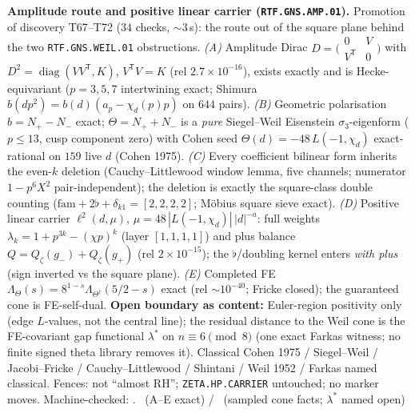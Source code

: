 \par\smallskip\noindent\textbf{Amplitude route and positive linear carrier
(\texttt{RTF.GNS.AMP.01}).}
Promotion of discovery T67--T72 ($34$ checks, $\sim3$\,s): the route out of the
square plane behind the two \texttt{RTF.GNS.WEIL.01} obstructions.
\emph{(A)} Amplitude Dirac
$D=\bigl(\begin{smallmatrix}0&V\\V^{\mathsf T}&0\end{smallmatrix}\bigr)$ with
$D^2=\operatorname{diag}(VV^{\mathsf T},K)$, $V^{\mathsf T}V=K$
(rel $2.7\times10^{-16}$), exists exactly and is Hecke-equivariant ($p=3,5,7$
intertwining exact; Shimura $b(dp^2)=b(d)(a_p-\chi_d(p)p)$ on $644$ pairs).
\emph{(B)} Geometric polarisation $b=N_+-N_-$ exact;
$\Theta=N_++N_-$ is a \emph{pure} Siegel--Weil Eisenstein $\sigma_3$-eigenform
($p\le13$, cusp component zero) with Cohen seed
$\Theta(d)=-48\,L(-1,\chi_d)$ exact-rational on $159$ live $d$ (Cohen 1975).
\emph{(C)} Every coefficient bilinear form inherits the even-$k$ deletion
(Cauchy--Littlewood window lemma, five channels; numerator $1-p^6X^2$
pair-independent); the deletion is exactly the square-class double counting
($\mathrm{fam}+2\flat+\delta_{k1}=[2,2,2,2]$; M\"obius square sieve exact).
\emph{(D)} Positive linear carrier $\ell^2(d,\mu)$,
$\mu=48\,|L(-1,\chi_d)|\,|d|^{-a}$: full weights
$\lambda_k=1+p^{3k}-(\chi p)^k$ (layer $[1,1,1,1]$) and plus balance
$Q=Q_\zeta(g_-)+Q_\zeta(g_+)$ (rel $2\times10^{-15}$); the $\flat$/doubling
kernel enters \emph{with plus} (sign inverted vs the square plane).
\emph{(E)} Completed FE
$\Lambda_\Theta(s)=8^{1-s}\Lambda_{\Theta^\dagger}(5/2-s)$ exact
(rel $\sim10^{-40}$; Fricke closed); the guaranteed cone is FE-self-dual.
\textbf{Open boundary as content:} Euler-region positivity only (edge
$L$-values, not the central line); the residual distance to the Weil cone is
the FE-covariant gap functional $\lambda^*$ on $n\equiv6\pmod 8$ (one exact
Farkas witness; no finite signed theta library removes it). Classical
Cohen 1975 / Siegel--Weil / Jacobi--Fricke / Cauchy--Littlewood / Shintani /
Weil 1952 / Farkas named classical. Fences: not ``almost RH'';
\texttt{ZETA.HP.CARRIER} untouched; no marker moves.
Machine-checked: .
\mE\ (A--E exact) / \mC\ (sampled cone facts; $\lambda^*$ named open)


